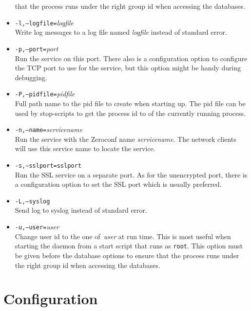 \begin{itemize}
that the process runs under the right group id when accessing the
databases.
\item
\texttt{-l,--logfile=}\textit{logfile}
\\
Write log messages to a log file named \textit{logfile} instead of
standard error.
\item
\texttt{-p,--port=}\textit{port}
\\
Run the service on this port.
There also is a configuration option to configure the TCP port to use
for the service, but this option might be handy during debugging.
\item
\texttt{-P,--pidfile=}\textit{pidfile}
\\
Full path name to the pid file to create when starting up.
The pid file can be used by stop-scripts to get the process id
to of the currently running process.
\item
\texttt{-n,--name=}\textit{servicename}
\\
Run the service with the Zeroconf name \textit{servicename}.
The network clients will use this service name to locate the service.
\item
\texttt{-s,--sslport=}\texttt{sslport}
\\
Run the SSL service on a separate port.
As for the unencrypted port, there is a configuration option to set the
SSL port which is usually preferred.
\item
\texttt{-L,--syslog}
\\
Send log to syslog instead of standard error.
\item
\texttt{-u,--user=}\textit{user}
\\
Change user id to the one of~\textit{user} at run time.
This is most useful when starting the daemon from a start script
that runs as \texttt{root}.
This option must be given before the database options to ensure
that the process runs under the right group id when accessing the
databases.

\end{itemize}

\section{Configuration}




